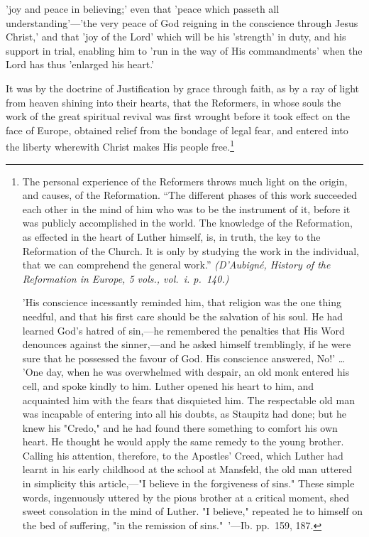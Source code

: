 \documentclass[
]{book}
\begin{document}
'joy and peace in believing;' even that 'peace which passeth all understanding'---'the very peace of God reigning in the conscience through Jesus Christ,' and that 'joy of the Lord' which will be his 'strength' in duty, and his support in trial, enabling him to 'run in the way of His commandments' when the Lord has thus 'enlarged his heart.'

It was by the doctrine of Justification by grace through faith, as by a ray of light from heaven shining into their hearts, that the Reformers, in whose souls the work of the great spiritual revival was first wrought before it took effect on the face of Europe, obtained relief from the bondage of legal fear, and entered into the liberty wherewith Christ makes His people free.\footnote{The personal experience of the Reformers throws much light on the origin, and causes, of the Reformation.
  ``The different phases of this work succeeded each other in the mind of him who was to be the instrument of it, before it was publicly accomplished in the world. The knowledge of the Reformation, as effected in the heart of Luther himself, is, in truth, the key to the Reformation of the Church. It is only by studying the work in the individual, that we can comprehend the general work.'' \emph{(D'Aubigné, History of the Reformation in Europe, 5 vols., vol.~i. p.~140.)}

  'His conscience incessantly reminded him, that religion was the one thing needful, and that his first care should be the salvation of his soul. He had learned God's hatred of sin,---he remembered the penalties that His Word denounces against the sinner,---and he asked himself tremblingly, if he were sure that he possessed the favour of God. His conscience answered, No!' \ldots{} 'One day, when he was overwhelmed with despair, an old monk entered his cell, and spoke kindly to him. Luther opened his heart to him, and acquainted him with the fears that disquieted him. The respectable old man was incapable of entering into all his doubts, as Staupitz had done; but he knew his "Credo," and he had found there something to comfort his own heart. He thought he would apply the same remedy to the young brother. Calling his attention, therefore, to the Apostles' Creed, which Luther had learnt in his early childhood at the school at Mansfeld, the old man uttered in simplicity this article,---"I believe in the forgiveness of sins." These simple words, ingenuously uttered by the pious brother at a critical moment, shed sweet consolation in the mind of Luther. "I believe," repeated he to himself on the bed of suffering, "in the remission of sins."~'---Ib. pp.~159, 187.

}
\end{document}
